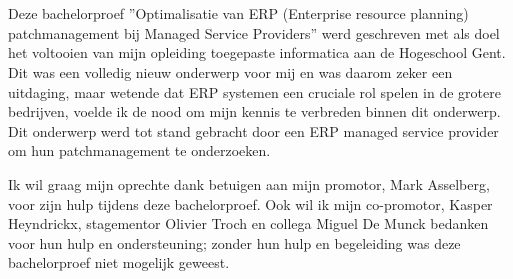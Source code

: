 
\chapter*{}%
\label{ch:voorwoord}



Deze bachelorproef ”Optimalisatie van ERP (Enterprise resource planning)
patchmanagement bij Managed Service Providers” werd geschreven met
als doel het voltooien van mijn opleiding toegepaste informatica aan de Hogeschool Gent.
Dit was een volledig nieuw onderwerp voor mij en was daarom zeker een uitdaging, maar wetende dat ERP systemen een cruciale rol spelen in de grotere bedrijven, voelde ik de nood om mijn kennis te verbreden binnen dit onderwerp. Dit onderwerp werd tot stand gebracht door een ERP managed service provider om hun patchmanagement te onderzoeken.

Ik wil graag mijn oprechte dank betuigen aan mijn promotor, Mark Asselberg, voor zijn hulp tijdens deze bachelorproef. Ook wil ik mijn co-promotor, Kasper Heyndrickx, stagementor Olivier Troch en collega Miguel De Munck bedanken voor hun hulp en ondersteuning; zonder hun hulp en begeleiding was deze bachelorproef niet mogelijk geweest.